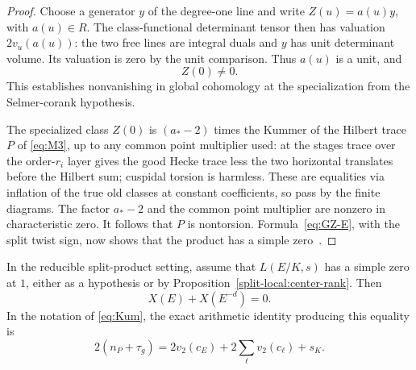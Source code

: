 \begin{proof}
Choose a generator \(y\) of the degree-one line and write \(Z(u)=a(u)y\), with \(a(u)\in R\). The class-functional determinant tensor then has valuation \(2v_u(a(u))\): the two free lines are integral duals and \(y\) has unit determinant volume. Its valuation is zero by the unit comparison. Thus \(a(u)\) is a unit, and
\[
 Z(0)\ne0.
\]
This establishes nonvanishing in global cohomology at the specialization from the Selmer-corank hypothesis.

The specialized class \(Z(0)\) is \((a_*-2)\) times the Kummer of the Hilbert trace \(P\) of \eqref{eq:M3}, up to any common point multiplier used: at the stages trace over the order-\(r_i\) layer gives the good Hecke trace less the two horizontal translates before the Hilbert sum; cuspidal torsion is harmless. These are equalities via inflation of the true old classes at constant coefficients, so pass by the finite diagrams. The factor \(a_*-2\) and the common point multiplier are nonzero in characteristic zero. It follows that \(P\) is nontorsion. Formula~\eqref{eq:GZ-E}, with the split twist sign, now shows that the product has a simple zero~\cite{GZ86,CST14}.
\end{proof}

\begin{proposition}\label{split-local:exact-factor}
In the reducible split-product setting, assume that \(L(E/K,s)\) has a simple zero at \(1\), either as a hypothesis or by Proposition~\ref{split-local:center-rank}. Then
\[
 X(E)+X(E^{-d})=0.
\]
In the notation of \eqref{eq:Kum}, the exact arithmetic identity producing this equality is
\[
 2(n_P+\tau_g)=2v_2(c_E)+2\sum_\ell v_2(c_\ell)+s_K.
 \tag{E}\label{eq:E}
\]
\end{proposition}

